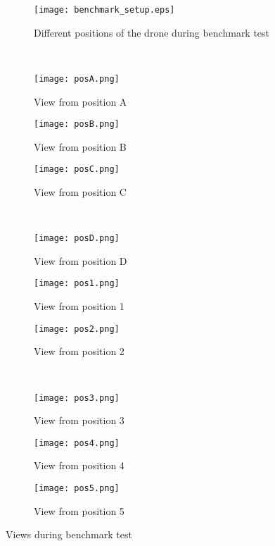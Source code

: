 \begin{figure}[H]
\centering
\begin{subfigure}{\textwidth}
  \centering
  \texttt{[image: benchmark\_setup.eps]}
  \caption{Different positions of the drone during benchmark test}
  \label{fig:benchmarksetup}
\end{subfigure}\\
\vspace{20 mm}
\begin{subfigure}{.33\textwidth}
  \centering
  \texttt{[image: posA.png]}
  \caption{View from position A}
  \label{fig:viewA}
\end{subfigure}%
\begin{subfigure}{.33\textwidth}
  \centering
  \texttt{[image: posB.png]}
  \caption{View from position B}
  \label{fig:viewB}
\end{subfigure}%
\begin{subfigure}{.33\textwidth}
  \centering
  \texttt{[image: posC.png]}
  \caption{View from position C}
  \label{fig:viewC}
\end{subfigure} \\

\begin{subfigure}{.33\textwidth}
  \centering
  \texttt{[image: posD.png]}
  \caption{View from position D}
  \label{fig:viewD}
\end{subfigure}%
\begin{subfigure}{.33\textwidth}
  \centering
  \texttt{[image: pos1.png]}
  \caption{View from position 1}
  \label{fig:view1}
\end{subfigure}%
\begin{subfigure}{.33\textwidth}
  \centering
  \texttt{[image: pos2.png]}
  \caption{View from position 2}
  \label{fig:view2}
\end{subfigure} \\

\begin{subfigure}{.33\textwidth}
  \centering
  \texttt{[image: pos3.png]}
  \caption{View from position 3}
  \label{fig:view3}
\end{subfigure}%
\begin{subfigure}{.33\textwidth}
  \centering
  \texttt{[image: pos4.png]}
  \caption{View from position 4}
  \label{fig:view4}
\end{subfigure}%
\begin{subfigure}{.33\textwidth}
  \centering
  \texttt{[image: pos5.png]}
  \caption{View from position 5}
  \label{fig:view5}
\end{subfigure}

\caption{Views during benchmark test}
\label{fig:benchmarkviews}
\end{figure}

